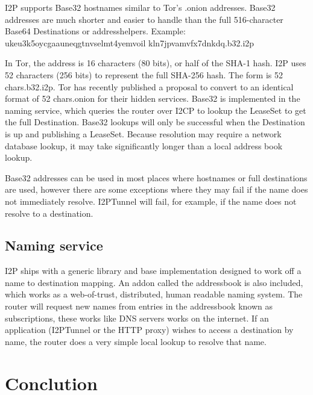 \documentclass[a4paper,twocolumn,12pt]{article}
\begin{document}
I2P supports Base32\cite{rfc4648} hostnames similar to Tor's\cite{tor-design} .onion
addresses. Base32 addresses are much shorter and easier to handle than the full
516-character Base64 Destinations or addresshelpers. Example:
ukeu3k5oycgaauneqgtnvselmt4yemvoil
kln7jpvamvfx7dnkdq.b32.i2p

In Tor\cite{tor-design}, the address is 16 characters (80 bits), or half of the
SHA-1 hash.  \cite{tor-hiddenservice} I2P uses 52 characters (256 bits) to
represent the full SHA-256 hash. The form is {52 chars}.b32.i2p.
Tor\cite{tor-design} has recently published a proposal to convert to an
identical format of {52 chars}.onion for their hidden services. Base32 is
implemented in the naming service, which queries the router over I2CP to lookup
the LeaseSet to get the full Destination. Base32 lookups will only be
successful when the Destination is up and publishing a LeaseSet. Because
resolution may require a network database lookup, it may take significantly
longer than a local address book lookup.

Base32 addresses can be used in most places where hostnames or full
destinations are used, however there are some exceptions where they may fail if
the name does not immediately resolve. I2PTunnel will fail, for example, if the
name does not resolve to a destination.

\subsection{Naming service}

I2P ships with a generic library and base implementation designed to work off a
name to destination mapping. An addon called the addressbook is also included,
which works as a web-of-trust, distributed, human readable naming system.
The router will request new names from entries in the addressbook known as
subscriptions, these works like DNS servers works on the internet.
If an application (I2PTunnel or the HTTP\cite{http-rfc} proxy) wishes to access a destination
by name, the router does a very simple local lookup to resolve that name.


\section{Conclution}




\end{document}
